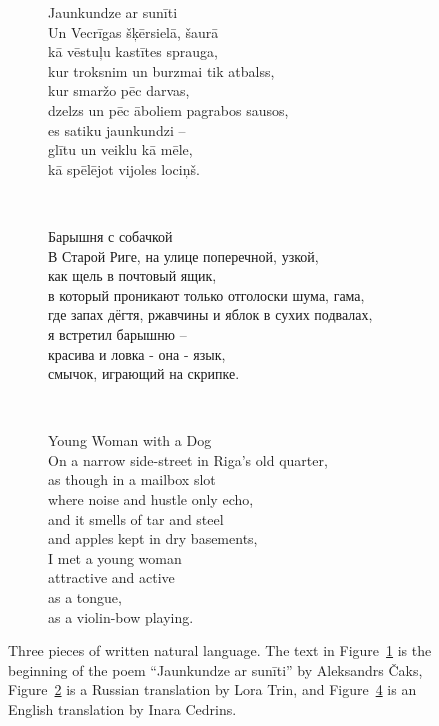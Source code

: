 \begin{figure}[t]
\tiny
\begin{subfigure}[t]{0.30\textwidth}
  Jaunkundze ar sunīti \\

  Un Vecrīgas šķērsielā, šaurā \\
  kā vēstuļu kastītes sprauga, \\
  kur troksnim un burzmai tik atbalss, \\
  kur smaržo pēc darvas, \\ ${}$\qquad dzelzs un pēc āboliem pagrabos sausos, \\
  es satiku jaunkundzi -- \\
  glītu un veiklu kā mēle, \\
  kā spēlējot vijoles lociņš.
  \vspace{0.74cm}
  \caption{}
  \label{fig:lv}
\end{subfigure}
~
\begin{subfigure}[t]{0.36\textwidth}
  Барышня с собачкой \\

  В Старой Риге, на улице поперечной, узкой, \\
  как щель в почтовый ящик, \\
  в который проникают только отголоски шума, гама, \\
  где запах дёгтя, ржавчины и яблок в сухих  подвалах, \\
  я встретил барышню -- \\
  красива и ловка - она - язык, \\
  смычок, играющий на скрипке.
  \vspace{0.99cm}
  \caption{}
  \label{fig:ru}
\end{subfigure}
~
\begin{subfigure}[t]{0.26\textwidth}
  Young Woman with a Dog \\

  On a narrow side-street in Riga’s old quarter, \\
  as though in a mailbox slot \\
  where noise and hustle only echo, \\
  and it smells of tar and steel \\
  and apples kept in dry basements, \\

  I met a young woman \\
  attractive and active \\
  as a tongue, \\
  as a violin-bow playing.
  \caption{}
  \label{fig:en}
\end{subfigure}
\caption[Three pieces of written natural language]{Three pieces of written natural language. The text in
  Figure~\ref{fig:lv} is the beginning of the poem ``Jaunkundze ar sunīti'' by
  Aleksandrs Čaks, Figure~\ref{fig:ru} is a Russian translation by Lora Trin,
  and Figure~\ref{fig:en} is an English translation by Inara Cedrins.}
\end{figure}
